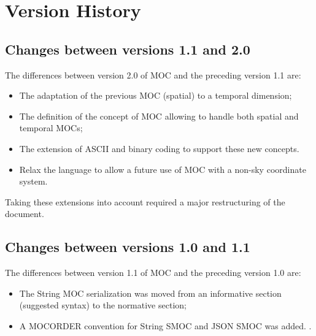 \documentclass[11pt,a4paper]{ivoa}
\begin{document}
\appendix
\section{Version History}

\subsection{Changes between versions 1.1 and 2.0}

The differences between version 2.0 of MOC and the preceding version 1.1 are:
\begin{itemize}
   \item The adaptation of the previous MOC (spatial) to a temporal
     dimension;
   \item The definition of the concept of MOC allowing to handle both
     spatial and temporal MOCs;
   \item The extension of ASCII and binary coding to support these new
     concepts.
    \item Relax the language to allow a future use of MOC with a non-sky coordinate system. 
\end{itemize}
Taking these extensions into account required a major restructuring of
the document.

\subsection{Changes between versions 1.0 and 1.1}
The differences between version 1.1 of MOC and the preceding version
1.0 are:
\begin{itemize}
   \item The String MOC serialization was moved from an informative
     section (suggested syntax) to the normative section;
   \item A MOCORDER convention for String SMOC and JSON SMOC was added.
     \citep{2020arXiv200707519D}.
\end{itemize}




\end{document}
